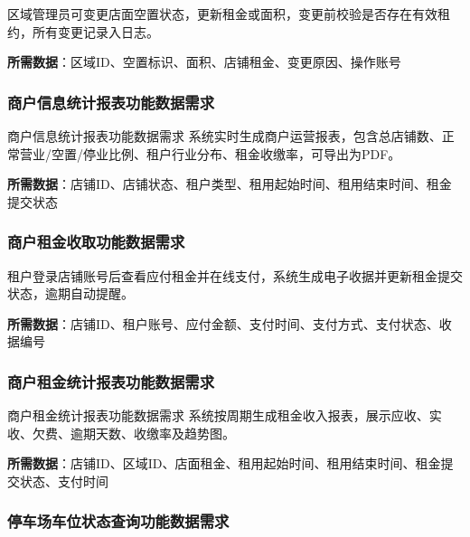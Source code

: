 \documentclass[]{article}
\begin{document}
区域管理员可变更店面空置状态，更新租金或面积，变更前校验是否存在有效租约，所有变更记录入日志。

\textbf{所需数据}：区域ID、空置标识、面积、店铺租金、变更原因、操作账号

\hypertarget{ux5546ux6237ux4fe1ux606fux7edfux8ba1ux62a5ux8868ux529fux80fdux6570ux636eux9700ux6c42}{%
  \subsubsection{商户信息统计报表功能数据需求}\label{ux5546ux6237ux4fe1ux606fux7edfux8ba1ux62a5ux8868ux529fux80fdux6570ux636eux9700ux6c42}}

商户信息统计报表功能数据需求
系统实时生成商户运营报表，包含总店铺数、正常营业/空置/停业比例、租户行业分布、租金收缴率，可导出为PDF。

\textbf{所需数据}：店铺ID、店铺状态、租户类型、租用起始时间、租用结束时间、租金提交状态

\hypertarget{ux5546ux6237ux79dfux91d1ux6536ux53d6ux529fux80fdux6570ux636eux9700ux6c42}{%
  \subsubsection{商户租金收取功能数据需求}\label{ux5546ux6237ux79dfux91d1ux6536ux53d6ux529fux80fdux6570ux636eux9700ux6c42}}

租户登录店铺账号后查看应付租金并在线支付，系统生成电子收据并更新租金提交状态，逾期自动提醒。

\textbf{所需数据}：店铺ID、租户账号、应付金额、支付时间、支付方式、支付状态、收据编号

\hypertarget{ux5546ux6237ux79dfux91d1ux7edfux8ba1ux62a5ux8868ux529fux80fdux6570ux636eux9700ux6c42}{%
  \subsubsection{商户租金统计报表功能数据需求}\label{ux5546ux6237ux79dfux91d1ux7edfux8ba1ux62a5ux8868ux529fux80fdux6570ux636eux9700ux6c42}}

商户租金统计报表功能数据需求
系统按周期生成租金收入报表，展示应收、实收、欠费、逾期天数、收缴率及趋势图。

\textbf{所需数据}：店铺ID、区域ID、店面租金、租用起始时间、租用结束时间、租金提交状态、支付时间

\hypertarget{ux505cux8f66ux573aux8f66ux4f4dux72b6ux6001ux67e5ux8be2ux529fux80fdux6570ux636eux9700ux6c42}{%
  \subsubsection{停车场车位状态查询功能数据需求}\label{ux505cux8f66ux573aux8f66ux4f4dux72b6ux6001ux67e5ux8be2ux529fux80fdux6570ux636eux9700ux6c42}}
\end{document}
